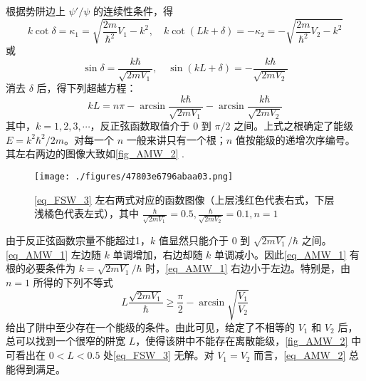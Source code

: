 根据势阱边上 $\psi'/\psi$ 的连续性条件，得
\begin{equation}
k\cot\delta=\kappa_1=\sqrt{\frac{2m}{\hbar^2}V_1-k^2},\quad k\cot(Lk+\delta)=-\kappa_2=-\sqrt{\frac{2m}{\hbar^2}V_2-k^2}
\end{equation}
或
\begin{equation}
\sin\delta=\frac{k\hbar}{\sqrt{2mV_1}},\quad\sin(kL+\delta)=-\frac{k\hbar}{\sqrt{2mV_2}}
\end{equation}
消去 $\delta$ 后，得下列超越方程：
\begin{equation}\label{eq_AMW_1}
kL=n\pi-\arcsin\frac{k\hbar}{\sqrt{2mV_1}}-\arcsin\frac{k\hbar}{\sqrt{2mV_2}}
\end{equation}
其中，$k=1,2,3,\cdots$，反正弦函数取值介于 $0$ 到 $\pi/2$ 之间。上式之根确定了能级 $E=k^2\hbar^2/2m$。对每一个 $n$ 一般来讲只有一个根；$n$ 值按能级的递增次序编号。其左右两边的图像大致如\autoref{fig_AMW_2} .
\begin{figure}[ht]
\centering
\texttt{[image: ./figures/47803e6796abaa03.png]}
\caption{\autoref{eq_FSW_3} 左右两式对应的函数图像（上层浅红色代表右式，下层浅橘色代表左式），其中 $\frac{\hbar}{\sqrt{2mV_1}}=0.5,\frac{\hbar}{\sqrt{2mV_2}}=0.1,n=1$} \label{fig_AMW_2}
\end{figure}
由于反正弦函数宗量不能超过1，$k$ 值显然只能介于 $0$ 到 $\sqrt{2mV_1}/\hbar$ 之间。\autoref{eq_AMW_1} 左边随 $k$ 单调增加，右边却随 $k$ 单调减小。因此\autoref{eq_AMW_1} 有根的必要条件为 $k=\sqrt{2mV_1}/\hbar$ 时，\autoref{eq_AMW_1} 右边小于左边。特别是，由 $n=1$ 所得的下列不等式
\begin{equation}\label{eq_AMW_2}
L\frac{\sqrt{2mV_1}}{\hbar}\geq\frac{\pi}{2}-\arcsin\sqrt{\frac{V_1}{V_2}}
\end{equation}
给出了阱中至少存在一个能级的条件。由此可见，给定了不相等的 $V_1$ 和 $V_2$ 后，总可以找到一个很窄的阱宽 $L$，使得该阱中不能存在离散能级，\autoref{fig_AMW_2} 中可看出在 $0<L<0.5$ 处\autoref{eq_FSW_3} 无解。对 $V_1=V_2$ 而言，\autoref{eq_AMW_2} 总能得到满足。